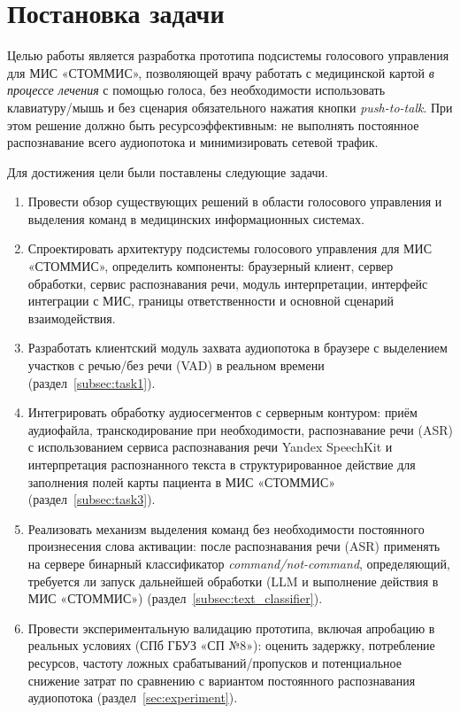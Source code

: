 
\clearpage

\section{Постановка задачи}
\label{sec:task}

Целью работы является разработка прототипа подсистемы голосового управления для МИС «СТОММИС», позволяющей врачу работать с медицинской картой \emph{в процессе лечения} с помощью голоса, без необходимости использовать клавиатуру/мышь и без сценария обязательного нажатия кнопки \emph{push-to-talk}.
При этом решение должно быть ресурсоэффективным: не выполнять постоянное распознавание всего аудиопотока и минимизировать сетевой трафик.

Для достижения цели были поставлены следующие задачи.
\begin{enumerate}
    \item Провести обзор существующих решений в области голосового управления и выделения команд в медицинских информационных системах.
    \item Спроектировать архитектуру подсистемы голосового управления для МИС «СТОММИС», определить компоненты: браузерный клиент, сервер обработки, сервис распознавания речи, модуль интерпретации, интерфейс интеграции с МИС, границы ответственности и основной сценарий взаимодействия.
    \item Разработать клиентский модуль захвата аудиопотока в браузере с выделением участков с речью/без речи (VAD) в реальном времени (раздел~\ref{subsec:task1}).
    \item Интегрировать обработку аудиосегментов с серверным контуром: приём аудиофайла, транскодирование при необходимости, распознавание речи (ASR) с использованием сервиса распознавания речи Yandex SpeechKit и интерпретация распознанного текста в структурированное действие для заполнения полей карты пациента в МИС «СТОММИС» (раздел~\ref{subsec:task3}).
    \item Реализовать механизм выделения команд без необходимости постоянного произнесения слова активации: после распознавания речи (ASR) применять на сервере бинарный классификатор \textit{command/not-command}, определяющий, требуется ли запуск дальнейшей обработки (LLM и выполнение действия в МИС «СТОММИС») (раздел~\ref{subsec:text_classifier}).
    \item Провести экспериментальную валидацию прототипа, включая апробацию в реальных условиях (СПб ГБУЗ «СП №8»): оценить задержку, потребление ресурсов, частоту ложных срабатываний/пропусков и потенциальное снижение затрат по сравнению с вариантом постоянного распознавания аудиопотока (раздел~\ref{sec:experiment}).
\end{enumerate}


